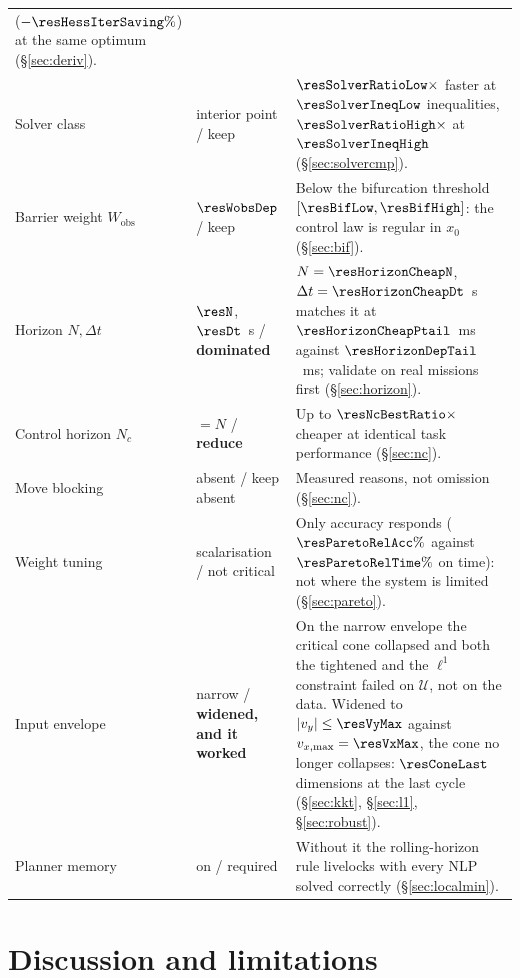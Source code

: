 \documentclass[11pt,a4paper]{article}
\newcommand{\Wobs}{W_{\mathrm{obs}}}
\newcommand{\Ninput}{N_c}
\begin{document}
\begin{table}[htbp]
\begin{tabular}{p{}p{}p{}}
      ($-\resHessIterSaving\%$) at the same optimum (\S\ref{sec:deriv}). \\
    Solver class & interior point / keep & $\resSolverRatioLow\times$ faster at $\resSolverIneqLow$
      inequalities, $\resSolverRatioHigh\times$ at $\resSolverIneqHigh$ (\S\ref{sec:solvercmp}). \\
    Barrier weight $\Wobs$ & $\resWobsDep$ / keep & Below the bifurcation threshold
      $[\resBifLow,\resBifHigh]$: the control law is regular in $x_0$ (\S\ref{sec:bif}). \\
    Horizon $N,\Delta t$ & $\resN$, $\resDt$~s / \textbf{dominated} & $N=\resHorizonCheapN$,
      $\Delta t=\resHorizonCheapDt$~s matches it at $\resHorizonCheapPtail$~ms against
      $\resHorizonDepTail$~ms; validate on real missions first (\S\ref{sec:horizon}). \\
    Control horizon $\Ninput$ & $=N$ / \textbf{reduce} & Up to $\resNcBestRatio\times$ cheaper at identical
      task performance (\S\ref{sec:nc}). \\
    Move blocking & absent / keep absent & Measured reasons, not omission (\S\ref{sec:nc}). \\
    Weight tuning & scalarisation / not critical & Only accuracy responds ($\resParetoRelAcc\%$ against
      $\resParetoRelTime\%$ on time): not where the system is limited (\S\ref{sec:pareto}). \\
    Input envelope & narrow / \textbf{widened, and it worked} & On the narrow envelope the critical cone
      collapsed and both the tightened and the $\ell^1$ constraint failed on $\mathcal{U}$, not on the data.
      Widened to $|v_y|\le\resVyMax$ against $v_{x,\max}=\resVxMax$, the cone no longer collapses:
      $\resConeLast$ dimensions at the last cycle (\S\ref{sec:kkt}, \S\ref{sec:l1}, \S\ref{sec:robust}). \\
    Planner memory & on / required & Without it the rolling-horizon rule livelocks with every NLP solved
      correctly (\S\ref{sec:localmin}). \\
    \bottomrule
  \end{tabular}
\end{table}

\section{Discussion and limitations}
\label{sec:discussion}
\end{document}
